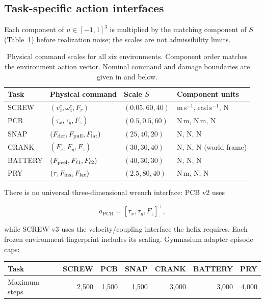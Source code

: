 \documentclass[10pt]{article}
\begin{document}
\subsection{Task-specific action interfaces}

Each component of $u\in[-1,1]^3$ is multiplied by the matching component of
$S$ (Table~\ref{tab:action-scales}) before realization noise; the scales are
not admissibility limits.

\begin{table}[tbp]
\centering\small
\caption{Physical command scales for all six environments. Component order
matches the environment action vector. Nominal command and damage boundaries
are given in  and below.}
\label{tab:action-scales}
\begin{tabular}{@{}llll@{}}
\toprule
Task & Physical command & Scale $S$ & Component units\\
\midrule
SCREW & $(v_z^c,\omega_z^c,F_r)$ & $(0.05,60,40)$ & m\,s$^{-1}$, rad\,s$^{-1}$, N\\
PCB & $(\tau_x,\tau_y,F_z)$ & $(0.5,0.5,60)$ & N\,m, N\,m, N\\
SNAP & $(F_{\rm def},F_{\rm pull},F_{\rm lat})$ & $(25,40,20)$ & N, N, N\\
CRANK & $(F_x,F_y,F_z)$ & $(30,30,40)$ & N, N, N (world frame)\\
BATTERY & $(F_{\rm peel},F_{\ell1},F_{\ell2})$ & $(40,30,30)$ & N, N, N\\
PRY & $(\tau,F_{\rm ins},F_{\rm lat})$ & $(2.5,80,40)$ & N\,m, N, N\\
\bottomrule
\end{tabular}
\end{table}


There is no universal three-dimensional wrench interface: PCB v2 uses

\[
a_{\mathrm{PCB}}
=
[\tau_x,\tau_y,F_z]^{\top},
\]

while SCREW v3 uses the velocity/coupling interface the helix requires. Each
frozen environment fingerprint includes its scaling. Gymnasium adapter episode
caps:

\begin{center}
\begin{tabular}{lrrrrrr}
\toprule
Task & SCREW & PCB & SNAP & CRANK & BATTERY & PRY\\
\midrule
Maximum steps & 2,500 & 1,500 & 1,500 & 3,000 & 3,000 & 4,000\\
\bottomrule
\end{tabular}
\end{center}
\end{document}
